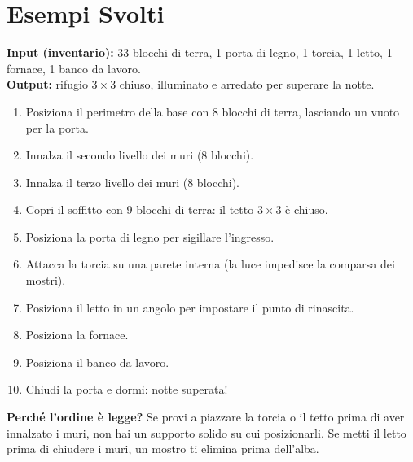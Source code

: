\section{Esempi Svolti}

\begin{esempio}
\textbf{Input (inventario):} 33 blocchi di terra, 1 porta di legno, 1 torcia, 1 letto, 1 fornace, 1 banco da lavoro.\\
\textbf{Output:} rifugio $3 \times 3$ chiuso, illuminato e arredato per superare la notte.

\begin{enumerate}
  \item Posiziona il perimetro della base con 8 blocchi di terra, lasciando un vuoto per la porta.
  \item Innalza il secondo livello dei muri (8 blocchi).
  \item Innalza il terzo livello dei muri (8 blocchi).
  \item Copri il soffitto con 9 blocchi di terra: il tetto $3 \times 3$ è chiuso.
  \item Posiziona la porta di legno per sigillare l'ingresso.
  \item Attacca la torcia su una parete interna (la luce impedisce la comparsa dei mostri).
  \item Posiziona il letto in un angolo per impostare il punto di rinascita.
  \item Posiziona la fornace.
  \item Posiziona il banco da lavoro.
  \item Chiudi la porta e dormi: notte superata!
\end{enumerate}

\textbf{Perché l'ordine è legge?} Se provi a piazzare la torcia o il tetto prima di aver innalzato i muri, non hai un supporto solido su cui posizionarli. Se metti il letto prima di chiudere i muri, un mostro ti elimina prima dell'alba.
\end{esempio}

